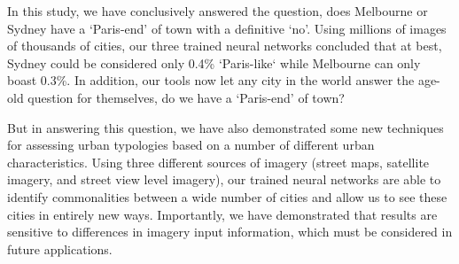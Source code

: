 \documentclass[10pt,letterpaper]{article}
\begin{document}
In this study, we have conclusively answered the question, does Melbourne or Sydney have a `Paris-end' of town with a definitive `no'. Using millions of images of thousands of cities, our three trained neural networks concluded that at best, Sydney could be considered only 0.4\% `Paris-like` while Melbourne can only boast 0.3\%. In addition, our tools now let any city in the world answer the age-old question for themselves, do we have a `Paris-end' of town?

But in answering this question, we have also demonstrated some new techniques for assessing urban typologies based on a number of different urban characteristics. Using three different sources of imagery (street maps, satellite imagery, and street view level imagery), our trained neural networks are able to identify commonalities between a wide number of cities and allow us to see these cities in entirely new ways. Importantly, we have demonstrated that results are sensitive to differences in imagery input information, which must be considered in future applications. 






\nolinenumbers
\end{document}

